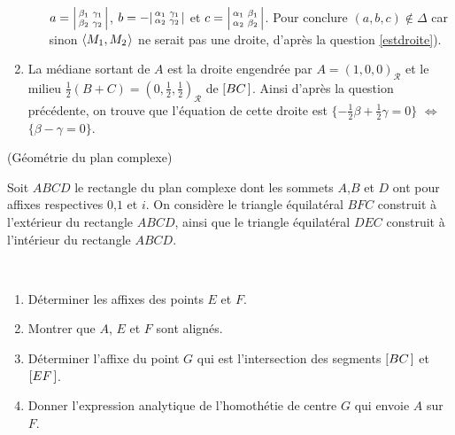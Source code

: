 \documentclass[a4paper,12pt,reqno]{amsart}
\begin{document}
\begin{solution}
\begin{enumerate}
\begin{enumerate}
      $
        a = \begin{vsmallmatrix}
              \beta_{1} & \gamma_{1} \\
              \beta_{2} & \gamma_{2}
            \end{vsmallmatrix}
      $,
      $
        b = - \begin{vsmallmatrix}
                \alpha_{1} & \gamma_{1} \\
                \alpha_{2} & \gamma_{2}
              \end{vsmallmatrix}
      $ et
      $
        c = \begin{vsmallmatrix}
              \alpha_{1} & \beta_{1} \\
              \alpha_{2} & \beta_{2}
            \end{vsmallmatrix}
      $.
      Pour conclure $(a,b,c) \notin \Delta$ car sinon $\langle{M_{1},M_{2}}\kern.07em\rangle$ ne serait pas une droite, d'après la question \ref{estdroite}).
    \end{enumerate}
    \item La médiane sortant de $A$ est la droite engendrée par $A=(1,0,0)_{\mathcal{R}}$ et le milieu $\frac{1}{2}(B+C)=(0,\frac{1}{2},\frac{1}{2})_{\mathcal{R}}$ de $[{BC}\kern.14em]$. Ainsi d'après la question précédente, on trouve que l'équation de cette droite est $\{ -\frac{1}{2}\beta + \frac{1}{2}\gamma = 0\}$ $\Leftrightarrow$ $\{ \beta - \gamma = 0\}$.
  \end{enumerate}
\end{solution}

\begin{exo} (Géométrie du plan complexe)

  \begin{minipage}[t]{.70\linewidth}
    Soit $ABCD$ le rectangle du plan complexe dont les sommets $A$,$B$ et $D$ ont pour affixes respectives $0$,$1$ et $i$. On considère le triangle équilatéral $BFC$ construit à l'extérieur du rectangle $ABCD$, ainsi que le triangle équilatéral $DEC$ construit à l'intérieur du rectangle $ABCD$.
  \end{minipage}
  \begin{minipage}[t]{.21\linewidth}~\\[17mm]
    \hspace*{\fill}
    \smash{\scalebox{2}{}}
  \end{minipage}

  \begin{enumerate}
    \item Déterminer les affixes des points $E$ et $F$.
    \item Montrer que $A$, $E$ et $F$ sont alignés.
    \item Déterminer l'affixe du point $G$ qui est l'intersection des segments $[{BC}\kern.14em]$ et $[{EF}\kern.14em]$.
    \item Donner l'expression analytique de l'homothétie de centre $G$ qui envoie $A$ sur $F$.
  \end{enumerate}


\end{exo}
\end{document}
